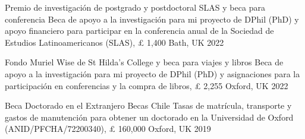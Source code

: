 





\vspace{1mm}

\begin{cvhonors}
\cvhonor
{Premio de investigación de postgrado y postdoctoral SLAS y beca para conferencia} 
{Beca de apoyo a la investigación para mi proyecto de DPhil (PhD) y apoyo financiero para participar en la conferencia anual de la Sociedad de Estudios Latinoamericanos (SLAS), {\pounds} 1,400}
{Bath, UK}
{2022}
\end{cvhonors}

\vspace{1mm}

\begin{cvhonors}
\cvhonor
{Fondo Muriel Wise de St Hilda's College y beca para viajes y libros} 
{Beca de apoyo a la investigación para mi proyecto de DPhil (PhD) y asignaciones para la participación en conferencias y la compra de libros, {\pounds} 2,255} 
{Oxford, UK}
{2022}
\end{cvhonors}

\vspace{1mm}

\begin{cvhonors}
\cvhonor
{Beca Doctorado en el Extranjero Becas Chile} 
{Tasas de matrícula, transporte y gastos de manutención para obtener un doctorado en la Universidad de Oxford (ANID/PFCHA/72200340), {\pounds} 160,000}
{Oxford, UK}
{2019}
\end{cvhonors}

\vspace{1mm}


